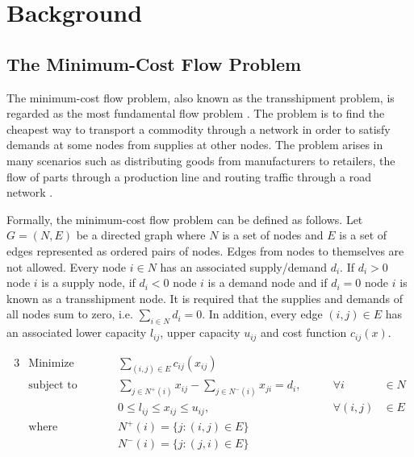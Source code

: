 \graphicspath{{chapters/chapter2/}}

\chapter{Background}

\section{The Minimum-Cost Flow Problem}

The minimum-cost flow problem, also known as the transshipment problem, is regarded as the most fundamental flow problem \parencite[4]{AhujaEtAl1993}. The problem is to find the cheapest way to transport a commodity through a network in order to satisfy demands at some nodes from supplies at other nodes. The problem arises in many scenarios such as distributing goods from manufacturers to retailers, the flow of parts through a production line and routing traffic through a road network \parencite[5]{AhujaEtAl1993}.

Formally, the minimum-cost flow problem can be defined as follows. Let $G=(N,E)$ be a directed graph where $N$ is a set of nodes and $E$ is a set of edges represented as ordered pairs of nodes. Edges from nodes to themselves are not allowed. Every node $i \in N$ has an associated supply/demand $d_i$. If $d_i > 0$ node $i$ is a supply node, if $d_i < 0$ node $i$ is a demand node and if $d_i = 0$ node $i$ is known as a transshipment node. It is required that the supplies and demands of all nodes sum to zero, i.e. $\sum_{i \in N} d_i = 0$. In addition, every edge $(i,j) \in E$ has an associated lower capacity $l_{ij}$, upper capacity $u_{ij}$ and cost function $c_{ij}(x)$.

\begin{alignat}{3} 
\label{eq:eq1} & \text{Minimize}   \qquad && \sum_{(i,j) \in E} c_{ij}(x_{ij})\\[1.5ex]
\label{eq:eq2} & \text{subject to} \qquad && \sum_{j \in N^+(i)} x_{ij} - \sum_{j \in N^-(i)} x_{ji} = d_i, \qquad & \forall i &\in N\\[1.5ex]
\label{eq:eq3} &                   \qquad && 0 \leq l_{ij} \leq x_{ij} \leq u_{ij}, \qquad & \forall (i,j) &\in E \\[1.5ex]
               & \text{where}      \qquad && N^+(i) = \{j:(i,j) \in E\}\\[1.5ex]
               &                   \qquad && N^-(i) = \{j:(j,i) \in E\}
\end{alignat}

